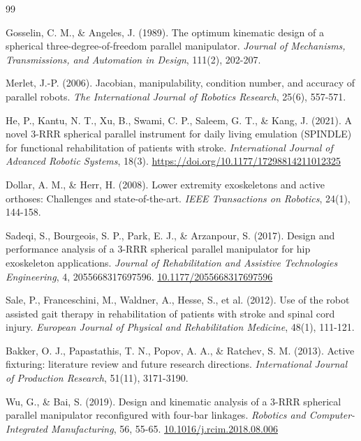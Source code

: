 \documentclass[letterpaper, 10 pt, conference]{ieeeconf}  %
\begin{document}
  
% 
\begin{thebibliography}{99}

Gosselin, C. M., \& Angeles, J. (1989). The optimum kinematic design of a spherical three-degree-of-freedom parallel manipulator. \textit{Journal of Mechanisms, Transmissions, and Automation in Design}, 111(2), 202-207.

Merlet, J.-P. (2006). Jacobian, manipulability, condition number, and accuracy of parallel robots. \textit{The International Journal of Robotics Research}, 25(6), 557-571.

He, P., Kantu, N. T., Xu, B., Swami, C. P., Saleem, G. T., \& Kang, J. (2021). A novel 3-RRR spherical parallel instrument for daily living emulation (SPINDLE) for functional rehabilitation of patients with stroke. \textit{International Journal of Advanced Robotic Systems}, 18(3). \url{https://doi.org/10.1177/17298814211012325}

Dollar, A. M., \& Herr, H. (2008). Lower extremity exoskeletons and active orthoses: Challenges and state-of-the-art. \textit{IEEE Transactions on Robotics}, 24(1), 144-158.

Sadeqi, S., Bourgeois, S. P., Park, E. J., \& Arzanpour, S. (2017). Design and performance analysis of a 3-RRR spherical parallel manipulator for hip exoskeleton applications. \textit{Journal of Rehabilitation and Assistive Technologies Engineering}, 4, 2055668317697596. \url{10.1177/2055668317697596}

Sale, P., Franceschini, M., Waldner, A., Hesse, S., et al. (2012). Use of the robot assisted gait therapy in rehabilitation of patients with stroke and spinal cord injury. \textit{European Journal of Physical and Rehabilitation Medicine}, 48(1), 111-121.

Bakker, O. J., Papastathis, T. N., Popov, A. A., \& Ratchev, S. M. (2013). Active fixturing: literature review and future research directions. \textit{International Journal of Production Research}, 51(11), 3171-3190.

Wu, G., \& Bai, S. (2019). Design and kinematic analysis of a 3-RRR spherical parallel manipulator reconfigured with four-bar linkages. \textit{Robotics and Computer-Integrated Manufacturing}, 56, 55-65. \url{10.1016/j.rcim.2018.08.006}


\end{thebibliography}
\end{document}
